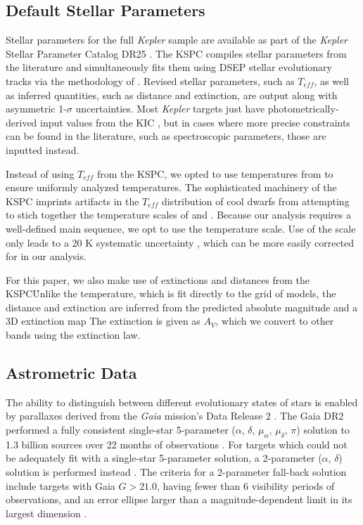 \documentclass[manuscript]{aastex6}
\newcommand{\Kepler}{\mbox{\textit{Kepler}}}
\newcommand{\Gaia}{\mbox{\textit{Gaia}}}
\newcommand{\Teff}{\ensuremath{T_{eff}}}
\begin{document}
\subsection{Default Stellar Parameters}

Stellar parameters for the full \Kepler{} sample are available as part of the
\Kepler{} Stellar Parameter Catalog DR25 \citep[KSPC]{Mathur17}. The KSPC
compiles stellar parameters from the literature and simultaneously fits them
using DSEP \citep{Dotter08} stellar evolutionary tracks via the methodology of
\citet{Huber14}. Revised stellar parameters, such as \Teff, as well as inferred
quantities, such as distance and extinction, are output along with asymmetric
1-\(\sigma\) uncertainties. Most \Kepler{} targets just have
photometrically-derived input values from the KIC \citep{Brown11}, but in cases
where more precise constraints can be found in the literature, such as
spectroscopic parameters, those are inputted instead.

Instead of using \Teff{} from the KSPC, we opted to use temperatures from
\citet{Pinsonneault12} to ensure uniformly analyzed temperatures. The
sophisticated machinery of the KSPC imprints artifacts in the \Teff{}
distribution of cool dwarfs from attempting to stich together the temperature
scales of \citet{Pinsonneault12} and \citet{Dressing13}. Because our analysis
requires a well-defined main sequence, we opt to use the \citet{Pinsonneault12}
temperature scale. Use of the \citet{Pinsonneault12} scale only leads to a 20 K
systematic uncertainty \citep{Huber17}, which can be more easily corrected for 
in our analysis.

For this paper, we also make use of extinctions and distances from the KSPC\.
Unlike the temperature, which is fit directly to the grid of models, the
distance and extinction are inferred from the predicted absolute magnitude and
a 3D extinction map \citep{Amores05} The extinction is given as \(A_V\), which we
convert to other bands using the \citep{Cardelli89} extinction law.

\subsection{Astrometric Data}

The ability to distinguish between different evolutionary states of stars is
enabled by parallaxes derived from the \Gaia{} mission's Data Release 2
\citep{Gaia18}. The Gaia DR2 performed a fully consistent single-star
5-parameter (\(\alpha\), \(\delta\), \(\mu_\alpha\), \(\mu_\delta\), \(\pi\))
solution to 1.3 billion sources over 22 months of observations
\citep{Lindegren18}. For targets which could not be adequately fit with a
single-star 5-parameter solution, a 2-parameter (\(\alpha\), \(\delta\))
solution is performed instead \citep{Michalik15}. The criteria for a
2-parameter fall-back solution include targets with Gaia \(G > 21.0\), having
fewer than 6 visibility periods of observations, and an error ellipse larger
than a magnitude-dependent limit in its largest dimension \citep{Lindegren18}.
\end{document}
